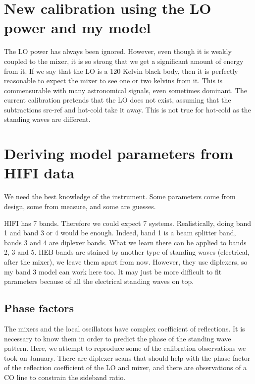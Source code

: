 \section{New calibration using the LO power and my model}
The LO power has always been ignored.
However, even though it is weakly coupled to the mixer, it is so strong that we get a significant amount of energy from it.
If we say that the LO is a 120 Kelvin black body, then it is perfectly reasonable to expect the mixer to see one or two kelvins from it.
This is commensurable with many astronomical signals, even sometimes dominant.
The current calibration pretends that the LO does not exist, assuming that the subtractions src-ref and hot-cold take it away.  This is not true for hot-cold as the standing waves are different.

\section{Deriving model parameters from HIFI data}
We need the best knowledge of the instrument.
Some parameters come from design, some from measure, and some are guesses.

HIFI has 7 bands.  Therefore we could expect 7 systems.
Realistically, doing band 1 and band 3 or 4 would be enough.
Indeed, band 1 is a beam splitter band, bands 3 and 4 are diplexer bands.
What we learn there can be applied to bands 2, 3 and 5.
HEB bands are stained by another type of standing waves (electrical, after the mixer), we leave them apart from now.
However, they use diplexers, so my band 3 model can work here too.  It may just be more difficult to fit parameters because of all the electrical standing waves on top.

\subsection{Phase factors}
The mixers and the local oscillators have complex coefficient of reflections.
It is necessary to know them in order to predict the phase of the standing wave pattern.
Here, we attempt to reproduce some of the calibration observations we took on January.  There are diplexer scans that should help with the phase factor of the reflection coefficient of the LO and mixer, and there are observations of a CO line to constrain the sideband ratio.
